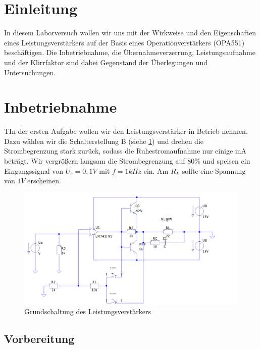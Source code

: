 \documentclass{article}
\begin{document}
\tableofcontents

\listoffigures
\listoftables
\newpage

\section{Einleitung}
\label{sec:einleitung}

In diesem Laborversuch wollen wir uns mit der Wirkweise und den Eigenschaften eines Leistungsverstärkers auf der Basis eines Operationverstärkers (OPA551) beschäftigen. Die Inbetriebnahme, die Übernahmeverzerrung, Leistungsaufnahme und der Klirrfaktor sind dabei Gegenstand der Überlegungen und Untersuchungen.

\section{Inbetriebnahme}
\label{sec:inbetriebnahme}

\begin{task}
  TIn der ersten Aufgabe wollen wir den Leistungsverstärker in Betrieb nehmen. Dazu wählen wir die Schalterstellung B (siehe \ref{fig:schalt1}) und drehen die Strombegrenzung stark zurück, sodass die Ruhestromaufnahme nur einige mA beträgt. Wir vergrößern langsam die Strombegrenzung auf 80\% und speisen ein Eingangssignal von $U_{e} = 0,1V$ mit $f = 1kHz$ ein. Am $R_{L}$ sollte eine Spannung von $1V$ erscheinen.
\end{task}

\begin{figure}[h]
  \centering
  \includegraphics[width=\textwidth]{../assets/images/ELP2_4/schalt1.png}
  \caption{Grundschaltung des Leistungsverstärkers}
  \label{fig:schalt1}
\end{figure}

\subsection{Vorbereitung}
\label{sec:vorbereitung}
\end{document}
